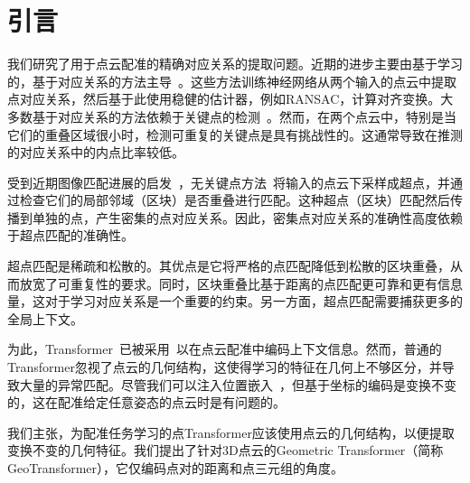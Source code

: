 %
%
%
%
%
%


\chapter{引言}
我们研究了用于点云配准的精确对应关系的提取问题。近期的进步主要由基于学习的，基于对应关系的方法主导~\cite{deng2018ppfnet,gojcic2019perfect,choy2019fully,bai2020d3feat,huang2021predator,yu2021cofinet}。这些方法训练神经网络从两个输入的点云中提取点对应关系，然后基于此使用稳健的估计器，例如RANSAC，计算对齐变换。大多数基于对应关系的方法依赖于关键点的检测~\cite{choy2019fully,bai2020d3feat,ao2021spinnet,huang2021predator}。然而，在两个点云中，特别是当它们的重叠区域很小时，检测可重复的关键点是具有挑战性的。这通常导致在推测的对应关系中的内点比率较低。

受到近期图像匹配进展的启发~\cite{rocco2018neighbourhood,zhou2021patch2pix,sun2021loftr}，无关键点方法~\cite{yu2021cofinet}将输入的点云下采样成超点，并通过检查它们的局部邻域（区块）是否重叠进行匹配。这种超点（区块）匹配然后传播到单独的点，产生密集的点对应关系。因此，密集点对应关系的准确性高度依赖于超点匹配的准确性。

超点匹配是稀疏和松散的。其优点是它将严格的点匹配降低到松散的区块重叠，从而放宽了可重复性的要求。同时，区块重叠比基于距离的点匹配更可靠和更有信息量，这对于学习对应关系是一个重要的约束。另一方面，超点匹配需要捕获更多的全局上下文。

为此，Transformer~\cite{vaswani2017attention}已被采用~\cite{wang2019deep,yu2021cofinet}以在点云配准中编码上下文信息。然而，普通的Transformer忽视了点云的几何结构，这使得学习的特征在几何上不够区分，并导致大量的异常匹配。尽管我们可以注入位置嵌入~\cite{zhao2021point,yang2019modeling}，但基于坐标的编码是变换不变的，这在配准给定任意姿态的点云时是有问题的。

我们主张，为配准任务学习的点Transformer应该使用点云的几何结构，以便提取变换不变的几何特征。我们提出了针对3D点云的Geometric Transformer（简称GeoTransformer），它仅编码点对的距离和点三元组的角度。

